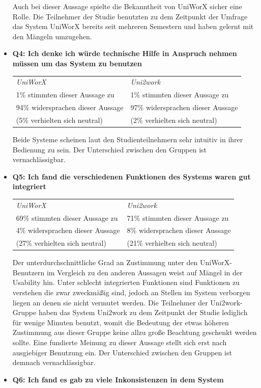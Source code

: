 \documentclass[11pt,a4paper,twoside,ngerman]{article}
\begin{document}
\begin{itemize}
    \smallskip
    Auch bei dieser Aussage spielte die Bekanntheit von UniWorX sicher eine Rolle. Die Teilnehmer der Studie benutzten zu dem Zeitpunkt der Umfrage das System UniWorX bereits seit mehreren Semestern und haben gelernt mit den Mängeln umzugehen.
    \item \textbf{Q4: Ich denke ich würde technische Hilfe in Anspruch nehmen müssen um das System zu benutzen}
    
    \smallskip
    \begin{tabular}{p{6.5cm}|p{6.5cm}}
        \textit{UniWorX} & \textit{Uni2work} \\
        1\% stimmten dieser Aussage zu & 1\% stimmten dieser Aussage zu \\
        94\% widersprachen dieser Aussage & 97\% widersprachen dieser Aussage \\
        (5\% verhielten sich neutral) &  (2\% verhielten sich neutral)
    \end{tabular}
    
    \smallskip
    Beide Systeme scheinen laut den Studienteilnehmern sehr intuitiv in ihrer Bedienung zu sein. Der Unterschied zwischen den Gruppen ist vernachlässigbar.
    \item \textbf{Q5: Ich fand die verschiedenen Funktionen des Systems waren gut integriert}
    
    \smallskip
    \begin{tabular}{p{6.5cm}|p{6.5cm}}
        \textit{UniWorX} & \textit{Uni2work} \\
        69\% stimmten dieser Aussage zu & 71\% stimmten dieser Aussage zu \\
        4\% widersprachen dieser Aussage & 8\% widersprachen dieser Aussage \\
        (27\% verhielten sich neutral) &  (21\% verhielten sich neutral)
    \end{tabular}
    
    \smallskip
    Der unterdurchschnittliche Grad an Zustimmung unter den UniWorX-Benutzern im Vergleich zu den anderen Aussagen weist auf Mängel in der Usability hin. Unter schlecht integrierten Funktionen sind Funktionen zu verstehen die zwar zweckmäßig sind, jedoch an Stellen im System verborgen liegen an denen sie nicht vermutet werden. Die Teilnehmer der Uni2work-Gruppe haben das System Uni2work zu dem Zeitpunkt der Studie lediglich für wenige Minuten benutzt, womit die Bedeutung der etwas höheren Zustimmung aus dieser Gruppe keine allzu große Beachtung geschenkt werden sollte. Eine fundierte Meinung zu dieser Aussage stellt sich erst nach ausgiebiger Benutzung ein. Der Unterschied zwischen den Gruppen ist demnach vernachlässigbar.
    \item \textbf{Q6: Ich fand es gab zu viele Inkonsistenzen in dem System}
    

\end{itemize}
\end{document}
